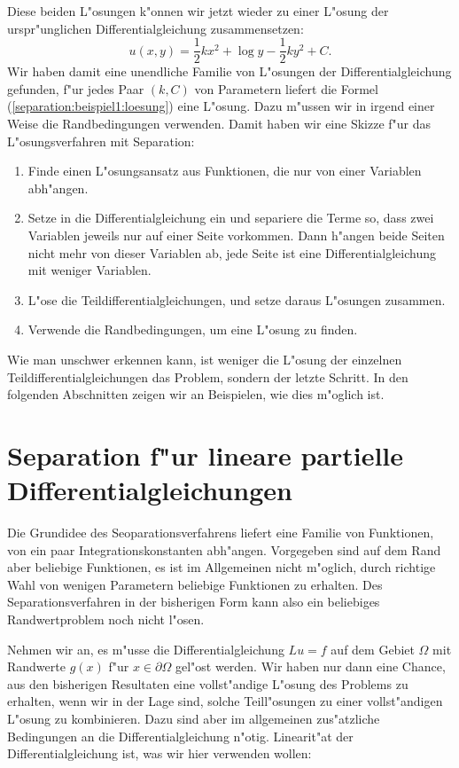 Diese beiden L"osungen k"onnen wir jetzt wieder zu einer L"osung der
urspr"unglichen Differentialgleichung zusammensetzen:
\begin{equation}
u(x,y)=
\frac12kx^2+
\log y-\frac12ky^2+C.
\label{separation:beispiel1:loesung}
\end{equation}
Wir haben damit eine unendliche Familie von L"osungen der
Differentialgleichung gefunden, f"ur jedes Paar $(k,C)$ von
Parametern liefert die Formel (\ref{separation:beispiel1:loesung})
eine L"osung.
Dazu m"ussen wir in irgend einer Weise die Randbedingungen verwenden.
Damit haben wir eine Skizze f"ur das L"osungsverfahren mit Separation:
\begin{enumerate}
\item Finde einen L"osungsansatz aus Funktionen, die nur von einer
Variablen abh"angen.
\item Setze in die Differentialgleichung ein und separiere die Terme
so, dass zwei Variablen jeweils nur auf einer Seite vorkommen. Dann
h"angen beide Seiten nicht mehr von dieser Variablen ab, jede Seite
ist eine Differentialgleichung mit weniger Variablen.
\item L"ose die Teildifferentialgleichungen, und setze daraus 
L"osungen zusammen. 
\item Verwende die Randbedingungen, um eine L"osung zu finden.
\end{enumerate}
Wie man unschwer erkennen kann, ist weniger die L"osung der
einzelnen Teildifferentialgleichungen das Problem, sondern der letzte
Schritt. In den folgenden Abschnitten zeigen wir an Beispielen, wie
dies m"oglich ist.

\section{Separation f"ur lineare partielle Differentialgleichungen}
Die Grundidee des Seoparationsverfahrens liefert eine Familie von Funktionen,
von ein paar Integrationskonstanten abh"angen. Vorgegeben sind auf dem
Rand aber beliebige Funktionen, es ist im Allgemeinen nicht m"oglich,
durch richtige Wahl von wenigen Parametern beliebige Funktionen zu erhalten.
Des Separationsverfahren in der bisherigen Form kann also ein
beliebiges Randwertproblem noch nicht l"osen.

Nehmen wir an, es m"usse die Differentialgleichung $Lu=f$ auf dem
Gebiet $\Omega$ mit Randwerte $g(x)$ f"ur $x\in\partial \Omega$
gel"ost werden.
Wir haben nur dann eine Chance, aus den bisherigen Resultaten eine 
vollst"andige L"osung des Problems zu erhalten, wenn wir in der
Lage sind, solche Teill"osungen zu einer vollst"andigen L"osung
zu kombinieren. Dazu sind aber im allgemeinen zus"atzliche
Bedingungen an die Differentialgleichung n"otig. Linearit"at der
Differentialgleichung ist, was wir hier verwenden wollen:

